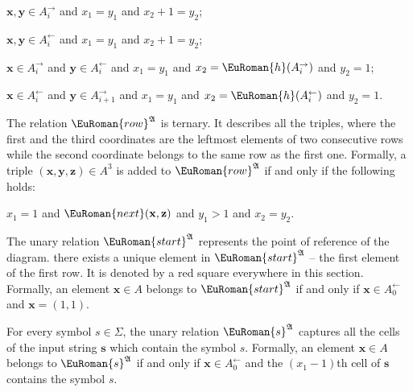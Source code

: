 \documentclass[10pt,a4paper]{amsart}
\theoremstyle{plain}
\theoremstyle{definition}
\numberwithin{equation}{section}
\newcommand{\eurm}[1]{\EuRoman{#1}} %
\newcommand{\structure}[1]{\mathfrak{#1}} %
\newcommand{\tuple}[1]{\mathbf{#1}} %
\newcommand{\rel}[1]{\eurm{#1}} %
\newcommand{\func}[1]{\eurm{#1}}  %
\begin{document}
\begin{compactitem}
\begin{compactitem}
\item $\tuple{x},\tuple{y}\in A_i^\rightarrow$ and $x_1=y_1$ and $x_2+1=y_2$;
\item $\tuple{x},\tuple{y}\in A_i^\leftarrow$ and $x_1=y_1$ and $x_2+1=y_2$;
\item $\tuple{x}\in A_i^\rightarrow$ and $\tuple{y}\in A_i^\leftarrow$ and $x_1=y_1$ and $x_2 = \func{h}(A_i^\rightarrow)$ and $y_2=1$;
\item $\tuple{x}\in A_i^\leftarrow$ and $\tuple{y}\in A_{i+1}^\rightarrow$ and $x_1=y_1$ and $x_2 = \func{h}(A_i^\leftarrow)$ and $y_2=1$.
\end{compactitem}
\item The relation $\rel{row}^\structure{A}$ is ternary. It describes all the triples, where the first and the third coordinates are the leftmost elements of two consecutive rows while the second coordinate belongs to the same row as the first one.
Formally, a triple $(\tuple{x},\tuple{y},\tuple{z})\in A^3$ is added to $\rel{row}^\structure{A}$ if and only if the following holds:
\begin{center}
$x_1=1$ \: and \: $\rel{next}(\tuple{x},\tuple{z})$ \: and \: $y_1>1$ \: and \: $x_2=y_2$.
\end{center}

\item The unary relation $\rel{start}^\structure{A}$ represents the point of reference of the diagram. 
there exists a unique element in $\rel{start}^\structure{A}$ -- the first element of the first row. It is denoted by a red square everywhere in this section. 
Formally, an element $\tuple{x}\in A$ belongs to $\rel{start}^\structure{A}$ if and only if $\tuple{x}\in A_0^\leftarrow$ and $\tuple{x} = (1,1)$.
\item For every symbol $s\in\Sigma$, the unary relation $\rel{s}^\structure{A}$ captures all the cells of the input string $\tuple{s}$ which contain the symbol $s$.
Formally, an element $\tuple{x}\in A$ belongs to $\rel{s}^\structure{A}$ if and only if $\tuple{x}\in A_0^\leftarrow$ and the $(x_1-1)$th cell of $\tuple{s}$ contains the symbol $s$.
\end{compactitem}
\end{document}
